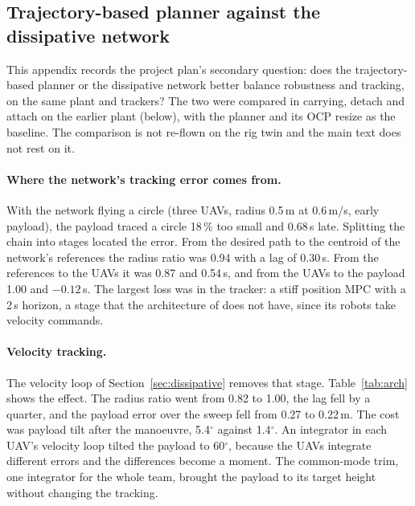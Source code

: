 
\subsection{Trajectory-based planner against the dissipative network}
\label{sec:sim_architecture}

This appendix records the project plan's secondary question: does the trajectory-based planner or the
dissipative network better balance robustness and tracking, on the same plant and trackers? The two were
compared in carrying, detach and attach on the earlier plant (below), with the planner and its OCP resize as
the baseline. The comparison is not re-flown on the rig twin and the main text does not rest on it.

\paragraph{Where the network's tracking error comes from.} With the network flying a circle (three
UAVs, radius 0.5\,m at 0.6\,m/s, early payload), the payload traced a circle 18\,\% too small and
0.68\,s late. Splitting the chain into stages located the error. From the desired path to the
centroid of the network's references the radius ratio was 0.94 with a lag of 0.30\,s. From the
references to the UAVs it was 0.87 and 0.54\,s, and from the UAVs to the payload 1.00 and $-0.12$\,s.
The largest loss was in the tracker: a stiff position MPC with a 2\,s horizon, a stage that the
architecture of \cite{quan2025swarm} does not have, since its robots take velocity commands.

\paragraph{Velocity tracking.} The velocity loop of Section~\ref{sec:dissipative} removes that
stage. Table~\ref{tab:arch} shows the effect. The radius ratio went from 0.82 to 1.00, the lag fell
by a quarter, and the payload error over the sweep fell from 0.27 to 0.22\,m. The cost was payload
tilt after the manoeuvre, 5.4$^\circ$ against 1.4$^\circ$. An integrator in each UAV's velocity loop
tilted the payload to 60$^\circ$, because the UAVs integrate different errors and the differences
become a moment. The common-mode trim, one integrator for the whole team, brought the payload to its
target height without changing the tracking.

